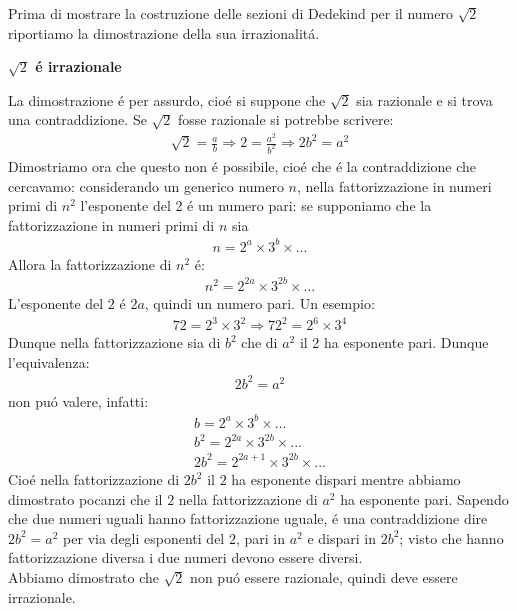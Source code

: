 \documentclass[twoside]{article} %
\begin{document}
	Prima di mostrare la costruzione delle sezioni di Dedekind per il numero $\sqrt{2}$ riportiamo la dimostrazione della sua irrazionalit\'a. 
	\begin{mdframed}[linewidth=1.5pt]
		\begin{center}		
			\textbf{\large \boldmath$\sqrt{2}$ \'e irrazionale}		
		\end{center}
		\noindent La dimostrazione \'e per assurdo, cio\'e si suppone che $\sqrt{2}$ sia razionale e si trova una contraddizione. Se $\sqrt{2}$ fosse razionale si potrebbe scrivere:
		\begin{gather*}
			\sqrt{2}=\frac{a}{b}\Rightarrow
			2=\frac{a^2}{b^2}\Rightarrow
			2b^2=a^2
		\end{gather*}
		Dimostriamo ora che questo non \'e possibile, cio\'e che \'e la contraddizione che cercavamo: considerando un generico numero $n$, nella fattorizzazione in numeri primi di $n^2$ l'esponente del 2 \'e un numero pari: se supponiamo che la fattorizzazione in numeri primi di $n$ sia
		\begin{gather*}
			n=2^{a}\times 3^{b}\times ...
		\end{gather*}	
		Allora la fattorizzazione di $n^2$ \'e:
		\begin{gather*}
			n^2=2^{2a}\times 3^{2b}\times ...
		\end{gather*}		
		L'esponente del $2$ \'e $2a$, quindi un numero pari. Un esempio:
		\begin{gather*}
			72=2^3\times 3^2\Rightarrow 72^2=2^6\times 3^4
		\end{gather*}
		Dunque nella fattorizzazione sia di $b^2$ che di $a^2$ il 2 ha esponente pari. Dunque l'equivalenza:
		\begin{gather*}
			2b^2=a^2
		\end{gather*}
		non pu\'o valere, infatti:
		\begin{gather*}
			b=2^a\times 3^b\times ...\\
			b^2=2^{2a}\times 3^{2b}\times ...\\
			2b^2=2^{2a+1}\times 3^{2b}\times ...
		\end{gather*} 
		Cio\'e nella fattorizzazione di $2b^2$ il $2$ ha esponente dispari mentre abbiamo dimostrato pocanzi che il $2$ nella fattorizzazione di $a^2$ ha esponente pari. Sapendo che due numeri uguali hanno fattorizzazione uguale, \'e una contraddizione dire $2b^2=a^2$ per via degli esponenti del $2$, pari in $a^2$ e dispari in $2b^2$; visto che hanno fattorizzazione diversa i due numeri devono essere diversi.\\
		Abbiamo dimostrato che $\sqrt{2}$ non pu\'o essere razionale, quindi deve essere irrazionale.
	\end{mdframed}
\end{document}
